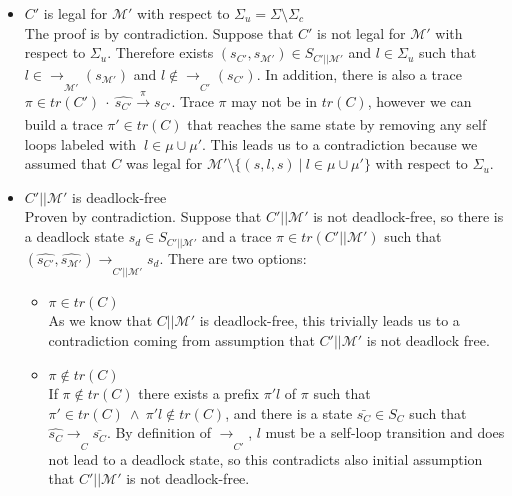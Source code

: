 \begin{itemize}
    \item $C'$ is legal for $\mathcal{M'}$ with respect to $\Sigma_u = \Sigma \setminus \Sigma_c$ \\
    The proof is by contradiction. Suppose that $C'$ is not legal for $\mathcal{M'}$ with respect to $\Sigma_u$. Therefore exists $(s_{C'},s_{\mathcal{M'}})\in S_{C'||\mathcal{M'}}$ and $l \in \Sigma_u$ such that $l \in \xrightarrow[]{}_{\mathcal{M'}}\!(s_{\mathcal{M'}})$ and $l \notin \xrightarrow[]{}_{C'}\!(s_{C'})$. In addition, there is also a trace $\pi \in tr(C') \ \cdot \ \hat{s_{C'}} \xrightarrow[]{\pi} s_{C'}$. Trace $\pi$ may not be in $tr(C)$, however we can build a trace $\pi' \in tr(C)$ that reaches the same state by removing any self loops labeled with $\ l \in \mu \cup \mu'$. This leads us to a contradiction because we assumed that $C$ was legal for $\mathcal{M'} \setminus \{ (s, l, s) \ | \ l \in \mu \cup \mu' \}$ with respect to $\Sigma_u$.
    
    \item $C' || \mathcal{M'}$ is deadlock-free \\ 
     Proven by contradiction. Suppose that $C' || \mathcal{M'}$ is not deadlock-free, so there is a deadlock state $s_d \in S_{C'||\mathcal{M'}}$ and a trace $\pi \in tr(C'||\mathcal{M'})$ such that $(\hat{s_{C'}},\hat{s_{\mathcal{M'}}}) \xrightarrow[]{}_{C'||\mathcal{M'}} s_d$. There are two options:
    \begin{itemize}
        \item $\pi \in tr(C)$ \\
        As we know that $C||\mathcal{M'}$ is deadlock-free, this trivially leads us to a contradiction coming from assumption that $C'||\mathcal{M'}$ is not deadlock free.
        \item $\pi \notin tr(C)$ \\
        If $\pi \notin tr(C)$ there exists a prefix $\pi'l$ of  $\pi$ such that $\pi' \in tr(C) \ \wedge \ \pi'l \notin tr(C)$, and there is a state $\bar{s_C} \in S_C$ such that $\hat{s_C} \xrightarrow[]{}_C \bar{s_C}$. By definition of $\xrightarrow[]{}_{C'}$, $l$ must be a self-loop transition and does not lead to a deadlock state, so this contradicts also initial assumption that $C'||\mathcal{M'}$ is not deadlock-free.
        
        

\end{itemize}
\end{itemize}
